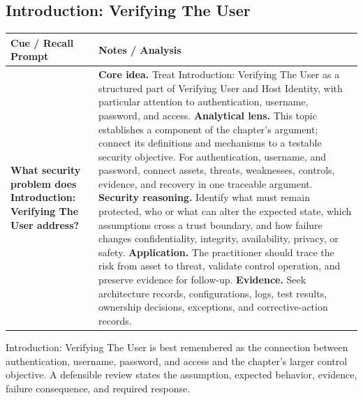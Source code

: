 \documentclass[11pt]{article}
\newcommand{\CornellHeader}{%
\rowcolor{Navy}\color{white}\bfseries Cue / Recall Prompt & \color{white}\bfseries Notes / Analysis\\\hline}
\newcommand{\CornellRow}[2]{%
\cellcolor{CueGray}\RaggedRight\textbf{#1} & \RaggedRight #2\\\hline}
\begin{document}
\subsection*{Introduction: Verifying The User}
\begin{longtable}{>{\RaggedRight\arraybackslash}p{}|>{\RaggedRight\arraybackslash}p{}}
\CornellHeader
\CornellRow{What security problem does Introduction: Verifying The User address?}{\textbf{Core idea.} Treat Introduction: Verifying The User as a structured part of Verifying User and Host Identity, with particular attention to authentication, username, password, and access. \textbf{Analytical lens.} This topic establishes a component of the chapter's argument; connect its definitions and mechanisms to a testable security objective. For authentication, username, and password, connect assets, threats, weaknesses, controls, evidence, and recovery in one traceable argument. \textbf{Security reasoning.} Identify what must remain protected, who or what can alter the expected state, which assumptions cross a trust boundary, and how failure changes confidentiality, integrity, availability, privacy, or safety. \textbf{Application.} The practitioner should trace the risk from asset to threat, validate control operation, and preserve evidence for follow-up. \textbf{Evidence.} Seek architecture records, configurations, logs, test results, ownership decisions, exceptions, and corrective-action records.}
\end{longtable}
\begin{topicsummary}
Introduction: Verifying The User is best remembered as the connection between authentication, username, password, and access and the chapter's larger control objective. A defensible review states the assumption, expected behavior, evidence, failure consequence, and required response.
\end{topicsummary}
\end{document}

